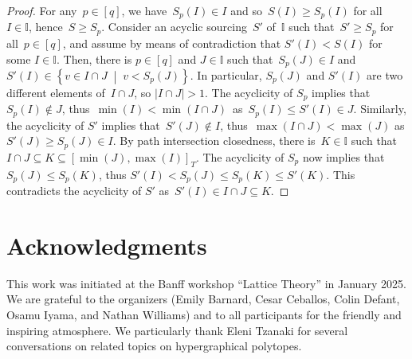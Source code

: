 \documentclass{amsart}
\theoremstyle{definition}
\newcommand{\set}[2]{\left\{ #1 \;\middle|\; #2 \right\}} %
\newcommand{\II}{\mathbb I} %
\begin{document}
\begin{proof}
For any~$p \in [q]$, we have~$S_p(I) \in I$ and so~$S(I) \ge S_p(I)$ for all~$I \in \II$, hence~$S \ge S_p$.
Consider an acyclic sourcing~$S'$ of~$\II$ such that~$S' \ge S_p$ for all~$p \in [q]$,
and assume by means of contradiction that $S'(I) < S(I)$ for some $I \in \II$.
Then, there is $p \in [q]$ and $J \in \II$ such that~$S_p(J) \in I$ and $S'(I) \in \set{v \in I \cap J}{v < S_p(J)}$.
In particular, $S_p(J)$ and $S'(I)$ are two different elements of~$I \cap J$, so $|I \cap J| > 1$.
The acyclicity of $S_p$ implies that $S_p(I) \notin J$, thus~${\min(I) < \min(I \cap J)}$~as~${S_p(I) \leq S'(I) \in J}$.
Similarly, the acyclicity of $S'$ implies that~${S'(J) \notin I}$, thus~${\max(I \cap J) < \max(J)}$ as $S'(J) \geq S_p(J) \in I$.
By path intersection closedness, there is~$K \in \II$ such that $I \cap J \subseteq K \subseteq [\min(J),\max(I)]_T$.
The acyclicity of $S_p$ now implies that $S_p(J) \leq S_p(K)$, thus $S'(I) < S_p(J) \leq S_p(K) \leq S'(K)$.
This contradicts the acyclicity of $S'$ as~${S'(I) \in I \cap J \subseteq K}$.
\end{proof}


\section*{Acknowledgments}

This work was initiated at the Banff workshop ``Lattice Theory'' in January 2025.
We are grateful to the organizers (Emily Barnard, Cesar Ceballos, Colin Defant, Osamu Iyama, and Nathan Williams) and to all participants for the friendly and inspiring atmosphere.
We particularly thank Eleni Tzanaki for several conversations on related topics on hypergraphical polytopes.




\label{sec:biblio}

\end{document}
